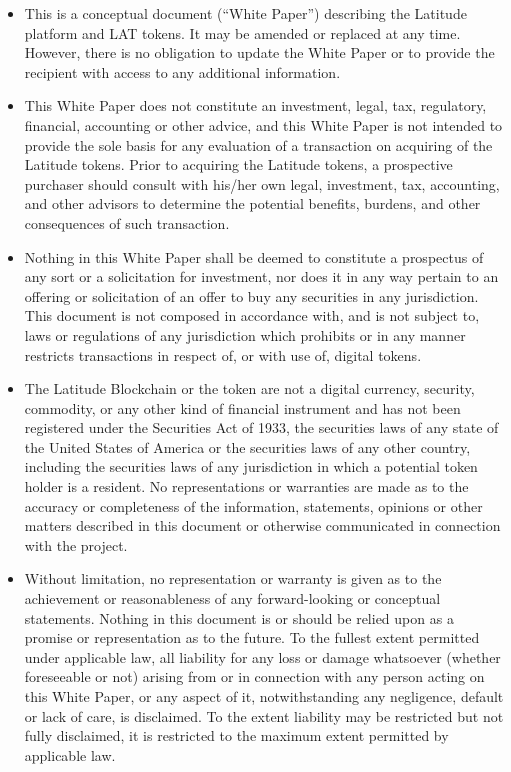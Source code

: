 \begin{declaration}
\addchaptertocentry{\authorshipname} %

\begin{itemize}
\item This is a conceptual document (“White Paper”) describing the Latitude platform and LAT tokens. It may be amended or
replaced at any time. However, there is no obligation to update the White Paper or to provide the recipient with access
to any additional information.

\item This White Paper does not constitute an investment, legal, tax, regulatory, financial, accounting or other advice, and
this White Paper is not intended to provide the sole basis for any evaluation of a transaction on acquiring of the
Latitude tokens. Prior to acquiring the Latitude tokens, a prospective purchaser should consult with his/her own legal,
investment, tax, accounting, and other advisors to determine the potential benefits, burdens, and other consequences of
such transaction.

\item Nothing in this White Paper shall be deemed to constitute a prospectus of any sort or a solicitation for investment, nor
does it in any way pertain to an offering or solicitation of an offer to buy any securities in any jurisdiction. This
document is not composed in accordance with, and is not subject to, laws or regulations of any jurisdiction which
prohibits or in any manner restricts transactions in respect of, or with use of, digital tokens.

\item The Latitude Blockchain or the token are not a digital currency, security, commodity, or any other kind of financial
instrument and has not been registered under the Securities Act of 1933, the securities laws of any state of the United
States of America or the securities laws of any other country, including the securities laws of any jurisdiction in
which a potential token holder is a resident.  No representations or warranties are made as to the accuracy or
completeness of the information, statements, opinions or other matters described in this document or otherwise
communicated in connection with the project.

\item Without limitation, no representation or warranty is given as to the achievement or reasonableness of any
forward-looking or conceptual statements. Nothing in this document is or should be relied upon as a promise or
representation as to the future. To the fullest extent permitted under applicable law, all liability for any loss or
damage whatsoever (whether foreseeable or not) arising from or in connection with any person acting on this White Paper,
or any aspect of it, notwithstanding any negligence, default or lack of care, is disclaimed. To the extent liability may
be restricted but not fully disclaimed, it is restricted to the maximum extent permitted by applicable law.


\end{itemize}
\end{declaration}
